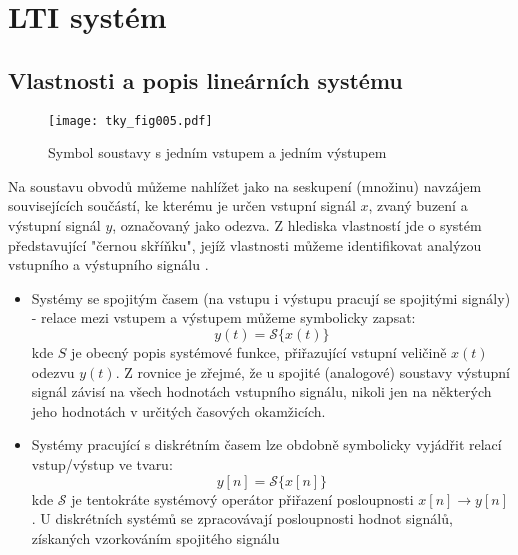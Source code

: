 \chapter{LTI systém}
\minitoc
  \section{Vlastnosti a popis lineárních systému}
  
    \begin{wrapfigure}[7]{r}{5cm}
      \centering
      \texttt{[image: tky\_fig005.pdf]}
      \caption[Symbol soustavy s jedním vstupem a jedním výstupem]{Symbol soustavy s jedním 
               vstupem a jedním výstupem}
      \label{tky:fig005}
    \end{wrapfigure}
    Na soustavu obvodů můžeme nahlížet jako na seskupení (množinu) navzájem souvisejících součástí, 
    ke kterému je určen vstupní signál $x$, zvaný buzení a výstupní signál $y$, označovaný jako 
    odezva. Z hlediska vlastností jde o systém představující "černou skříňku", jejíž vlastnosti 
    můžeme identifikovat analýzou vstupního a výstupního signálu \cite{Bicak}.        
    \begin{itemize}
      \item Systémy se spojitým časem (na vstupu i výstupu pracují se spojitými signály) - relace  
            mezi vstupem a výstupem můžeme symbolicky zapsat:
            \begin{equation}\label{sas:eq_spojity_system}
              y(t)=\mathcal{S}\{x(t)\}
            \end{equation}
            kde $S$ je obecný popis systémové funkce, přiřazující vstupní veličině $x(t)$ odezvu 
            $y(t)$. Z rovnice je zřejmé, že u spojité (analogové) soustavy výstupní signál závisí 
            na všech hodnotách vstupního signálu, nikoli jen na některých jeho hodnotách v určitých 
            časových okamžicích.
      \item Systémy pracující s diskrétním časem lze obdobně symbolicky vyjádřit relací  
            vstup/výstup ve tvaru:
            \begin{equation}\label{sas:eq_dis_system}
              y[n]=\mathcal{S}\{x[n]\}
            \end{equation}
            kde $\mathcal{S}$ je tentokráte systémový operátor přiřazení posloupnosti 
            $x[n]\rightarrow y[n]$. U diskrétních systémů se zpracovávají posloupnosti hodnot 
            signálů, získaných vzorkováním spojitého signálu
    \end{itemize}
    
